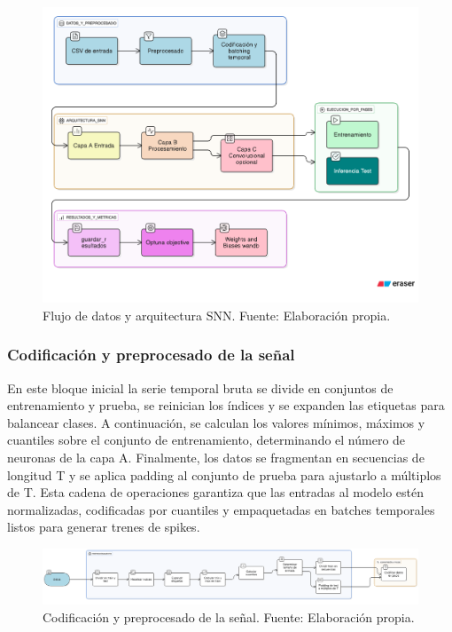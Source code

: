 
\begin{figure}[!htb]
    \centering
    \includegraphics[width=1.0\textwidth]{Imagenes/Diagrama SNN.png}
    \caption{Flujo de datos y arquitectura SNN. Fuente: Elaboración propia.}
    \label{fig:Flujo de datos y arquitectura SNN}
\end{figure}

\subsubsection{Codificación y preprocesado de la señal}

En este bloque inicial la serie temporal bruta se divide en conjuntos de entrenamiento y prueba, se reinician los índices y se expanden las etiquetas para balancear clases. A continuación, se calculan los valores mínimos, máximos y cuantiles sobre el conjunto de entrenamiento, determinando el número de neuronas de la capa A. Finalmente, los datos se fragmentan en secuencias de longitud T y se aplica padding al conjunto de prueba para ajustarlo a múltiplos de T. Esta cadena de operaciones garantiza que las entradas al modelo estén normalizadas, codificadas por cuantiles y empaquetadas en batches temporales listos para generar trenes de spikes.

\begin{figure}[!htb]
    \centering
    \includegraphics[width=1.0\textwidth]{Imagenes/Codificación y preprocesado de la señal (2).png}
    \caption{Codificación y preprocesado de la señal. Fuente: Elaboración propia.}
    \label{fig:Codificación y preprocesado de la señal}
\end{figure}
    
